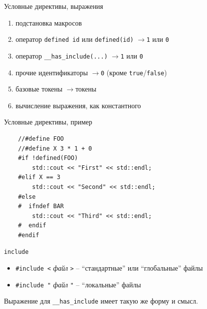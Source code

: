 \documentclass[unknownkeysallowed,xcolor=table]{beamer}
\newcommand{\rarr}{$\rightarrow$}
\begin{document}
\begin{frame}[fragile]{Условные директивы, выражения}
  \begin{enumerate}
    \item подстановка макросов \vspace{1em}
    \item оператор \lstinline{defined id} или \lstinline{defined(id)} \rarr \lstinline{1} или \lstinline{0} \vspace{1em}
    \item оператор \lstinline{__has_include(...)} \rarr \lstinline{1} или \lstinline{0} \vspace{1em}
    \item прочие идентификаторы \rarr \lstinline{0} (кроме \lstinline{true}/\lstinline{false}) \vspace{1em}
    \item базовые токены \rarr токены \vspace{1em}
    \item вычисление выражения, как константного
  \end{enumerate}
\end{frame}

\begin{frame}[fragile]{Условные директивы, пример}
  \begin{lstlisting}
    //#define FOO
    //#define X 3 * 1 + 0
    #if !defined(FOO)
        std::cout << "First" << std::endl;
    #elif X == 3
        std::cout << "Second" << std::endl;
    #else
    #  ifndef BAR
        std::cout << "Third" << std::endl;
    #  endif
    #endif
  \end{lstlisting}
\end{frame}

\begin{frame}[fragile]{\lstinline{include}}
  \begin{itemize}
    \item \lstinline{#include <} \emph{файл} \lstinline{>} -- ``стандартные'' или ``глобальные'' файлы \vspace{1em}
    \item \lstinline{#include "} \emph{файл} \lstinline{"} -- ``локальные'' файлы
  \end{itemize}

  \vspace{2em}

  Выражение для \lstinline{__has_include} имеет такую же форму и смысл.
\end{frame}
\end{document}
